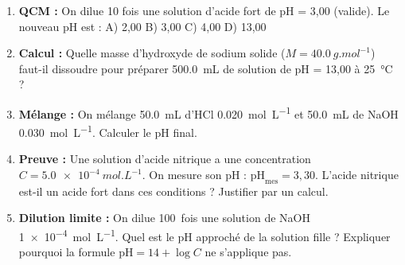 \documentclass[11pt]{article}
\begin{document}
\begin{exercice}
\begin{enumerate}
  \item \textbf{QCM :} On dilue 10 fois une solution d'acide fort de pH = 3,00 (valide). Le nouveau pH est :
  A) 2,00 \quad B) 3,00 \quad C) 4,00 \quad D) 13,00
  \item \textbf{Calcul :} Quelle masse d'hydroxyde de sodium solide ($M = \SI{40,0}{g.mol^{-1}}$) faut-il dissoudre pour préparer \SI{500,0}{mL} de solution de pH = 13,00 à \SI{25}{\celsius} ?
  \item \textbf{Mélange :} On mélange \SI{50,0}{mL} d'HCl \SI{0,020}{mol.L^{-1}} et \SI{50,0}{mL} de NaOH \SI{0,030}{mol.L^{-1}}. Calculer le pH final.
  \item \textbf{Preuve :} Une solution d'acide nitrique  a une concentration $C = \SI{5,0e-4}{mol.L^{-1}}$. On mesure son pH : $\mathrm{pH}_{\text{mes}} = 3,30$. L'acide nitrique est-il un acide fort dans ces conditions ? Justifier par un calcul.
  \item \textbf{Dilution limite :} On dilue \SI{100}{fois} une solution de NaOH \SI{1e-4}{mol.L^{-1}}. Quel est le pH approché de la solution fille ? Expliquer pourquoi la formule $\mathrm{pH} = 14 + \log C$ ne s'applique pas.
\end{enumerate}
\end{exercice}
\end{document}
